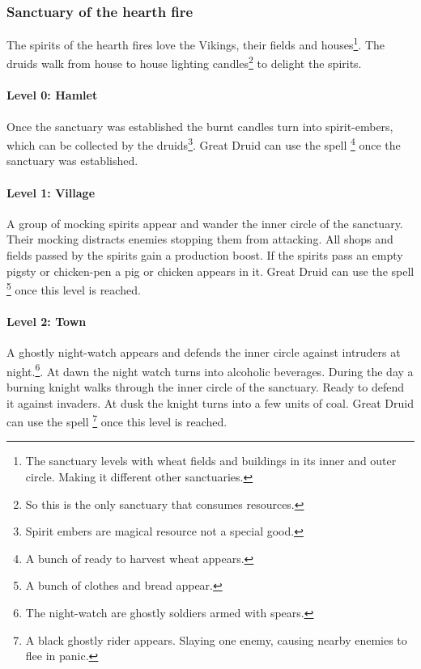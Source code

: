 \documentclass[a4paper]{book}
\begin{document}
		\subsubsection{Sanctuary of the hearth fire}
			The spirits of the hearth fires love the \gls{Vikings}, their fields and houses\footnote{
				The sanctuary levels with wheat fields and buildings in its inner and outer circle.
				Making it different other sanctuaries.
			}.
			The druids walk from house to house lighting candles\footnote{
				So this is the only sanctuary that consumes resources.
			} to delight the spirits.

			\paragraph{Level 0: Hamlet}
				Once the sanctuary was established the burnt candles turn into spirit-embers,
				which can be collected by the druids\footnote{
					Spirit embers are magical resource not a special good.
				}.
				Great Druid can use the spell \footnote{
					A bunch of ready to harvest wheat appears.
				} once the sanctuary was established.

			\paragraph{Level 1: Village}
				A group of mocking spirits appear and wander the inner circle of the sanctuary.
				Their mocking distracts enemies stopping them from attacking.
				All shops and fields passed by the spirits gain a production boost.
				If the spirits pass an empty pigsty or chicken-pen a pig or chicken appears in it.
				Great Druid can use the spell \footnote{
					A bunch of clothes and bread appear.
				} once this level is reached.

			\paragraph{Level 2: Town}
				A ghostly night-watch appears and defends the inner circle against intruders at night.\footnote{
					The night-watch are ghostly soldiers armed with spears.
				}.
				At dawn the night watch turns into alcoholic beverages.
				During the day a burning knight walks through the inner circle of the sanctuary.
				Ready to defend it against invaders.
				At dusk the knight turns into a few units of coal. 
				Great Druid can use the spell \footnote{
					A black ghostly rider appears.
					Slaying one enemy, causing nearby enemies to flee in panic.
				} once this level is reached.
\end{document}
